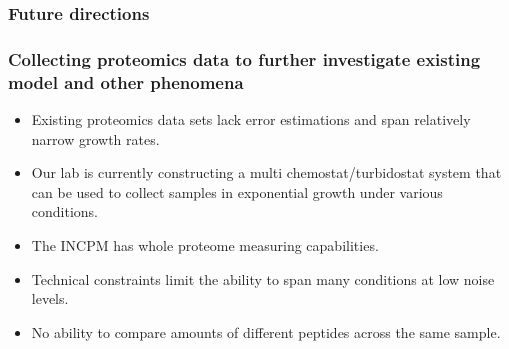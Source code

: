 \documentclass{beamer}
\begin{document}
\begin{frame}
\frametitle{Future directions}
\end{frame}

\begin{frame}
\frametitle{Collecting proteomics data to further investigate existing model and other phenomena}
\begin{itemize}
\item Existing proteomics data sets lack error estimations and span relatively narrow growth rates.
\item Our lab is currently constructing a multi chemostat/turbidostat system that can be used to collect samples in exponential growth under various conditions.
\item The INCPM has whole proteome measuring capabilities.
\item Technical constraints limit the ability to span many conditions at low noise levels.
\item No ability to compare amounts of different peptides across the same sample.
\end{itemize}
\end{frame}
\end{document}
